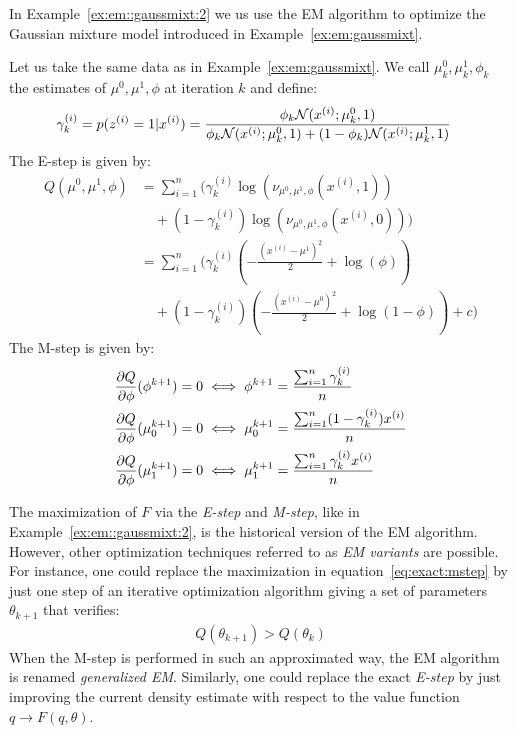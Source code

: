 In Example~\ref{ex:em::gaussmixt:2} we us use the EM algorithm to optimize the Gaussian mixture model introduced in Example~\ref{ex:em:gaussmixt}.
\begin{example}
  \label{ex:em::gaussmixt:2}
  Let us take the same data as in Example~\ref{ex:em:gaussmixt}. We call
  $\mu^0_k, \mu^1_k, \phi_k$ the estimates of $\mu^0, \mu^1, \phi$ at
  iteration $k$ and define:
  \begin{align}
    \gamma^{(i)}_k = p(z^{(i)} = 1 | x^{(i)}) &= \frac{\phi_k \mathcal{N}(x^{(i)}; \mu^0_k, 1)}{ \phi_k \mathcal{N}(x^{(i)}; \mu^0_k, 1) + (1 - \phi_k) \mathcal{N}(x^{(i)}; \mu^1_k, 1)} 
  \end{align}
  The E-step is given by:
  \begin{align}
    Q(\mu^0, \mu^1, \phi) &= \sum_{i=1}^n \Big( \gamma^{(i)}_k \log(\nu_{\mu^0, \mu^1, \phi}(x^{(i)}, 1)) \\ &\enspace \enspace + (1 - \gamma^{(i)}_k) \log(\nu_{\mu^0, \mu^1, \phi}(x^{(i)}, 0)) \Big) \\
              &= \sum_{i=1}^n \Big( \gamma^{(i)}_k( -\frac{(x^{(i)} - \mu^1)^2}{2} + \log(\phi)) \\ &\enspace \enspace + (1 - \gamma^{(i)}_k) ( -\frac{(x^{(i)} - \mu^0)^2}{2} + \log(1 -\phi)) + c \Big)
 \end{align}
 The M-step is given by:
 \begin{align}
   &\frac{ \partial Q}{\partial \phi}(\phi^{k + 1}) = 0 \iff \phi^{k + 1} = \frac{\sum_{i=1}^n \gamma^{(i)}_k}{n} \\
   &\frac{ \partial Q}{\partial \phi}(\mu^{k+1}_0) = 0 \iff \mu^{k + 1}_0 = \frac{\sum_{i=1}^n (1 - \gamma^{(i)}_k) x^{(i)}}{n} \\
   &\frac{ \partial Q}{\partial \phi}(\mu^{k+1}_1) = 0 \iff \mu^{k + 1}_1 = \frac{\sum_{i=1}^n \gamma^{(i)}_k x^{(i)}}{n}
 \end{align}
\end{example}


The maximization of $F$  via the \emph{E-step} and \emph{M-step}, like in
Example~\ref{ex:em::gaussmixt:2}, is the
historical version of the EM algorithm. However, other optimization techniques
referred to as \emph{EM variants}
are possible. For instance, one could replace the maximization in
equation~\eqref{eq:exact:mstep} by just one step of an iterative optimization
algorithm giving a set of parameters $\theta_{k+1}$ that verifies:
\begin{align}
  Q(\theta_{k+1}) > Q(\theta_k) 
\end{align}
When the M-step is performed in such an approximated way, the EM algorithm
is renamed \emph{generalized EM}.
Similarly, one could replace the exact \emph{E-step} by just improving the
current density estimate with respect to the value function $q \rightarrow F(q,
\theta)$.

